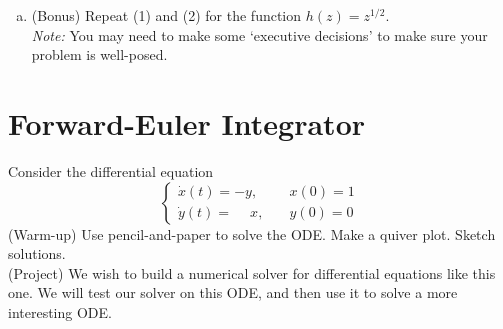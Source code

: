 \documentclass[11pt,oneside]{article}
\theoremstyle{definition}
\theoremstyle{definition}
\theoremstyle{remark}
\numberwithin{equation}{section}
\begin{document}
\begin{enumerate}[(a)]
\begin{minipage}{.29\textwidth}
    \begin{center}
    \end{center}
    \end{minipage}
    \item (Bonus) Repeat (1) and (2) for the function $h(z) = z^{1/2}$.\\
    \textit{Note:} You may need to make some `executive decisions' to make sure your problem is well-posed.
\end{enumerate}

\newpage
\section{Forward-Euler Integrator}
Consider the differential equation
\begin{equation}
\label{eq:ode_system}
\begin{cases} \dot{x}(t) = -y, & \quad x(0) = 1\\ \dot{y}(t) = \phantom{-}x, & \quad y(0) = 0 \end{cases}
\end{equation}
(Warm-up) Use pencil-and-paper to solve the ODE. Make a quiver plot. Sketch solutions.\\
(Project) We wish to build a numerical solver for differential equations like this one. We will test our solver on this ODE, and then use it to solve a more interesting ODE.
\end{document}
